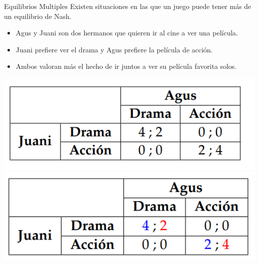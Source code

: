\documentclass{beamer}
\begin{document}
\begin{frame}{Equilibrios Multiples}
    Existen situaciones en las que un juego puede tener más de un equilibrio de Nash.
    \begin{itemize}
        \item Agus y Juani son dos hermanos que quieren ir al cine a ver una película.
        \item Juani prefiere ver el drama y Agus prefiere la película de acción. 
        \item Ambos valoran más el hecho de ir juntos a ver su película favorita solos.
    \end{itemize}
    \begin{center}
        \includegraphics[scale=0.5]{../Figures/T20.6.png}
        \includegraphics[scale=0.5]{../Figures/T20.7.png}
    \end{center}
\end{frame}
\end{document}

